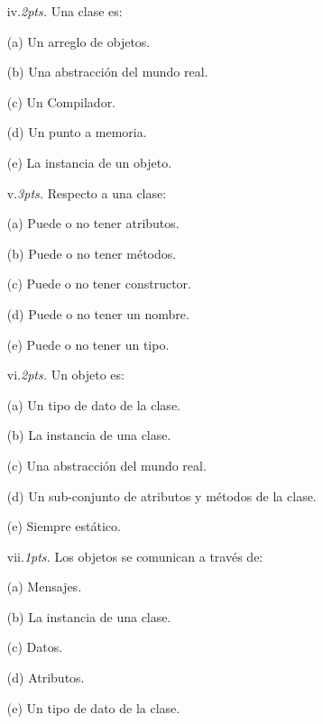\documentclass[10pt]{article}
\begin{document}
\begin{enumerate}
{\begin{multicols}{2}
    \begin{enumerate}[label=(\alph*)]
        \item[iv.\emph{2pts.}] Una clase es:
        \item[(a)] Un arreglo de objetos.
        \item[(b)] Una abstracci\'on del mundo real.
        \item[(c)] Un  Compilador.
        \item[(d)] Un punto a memoria.
        \item[(e)] La instancia de un objeto.
    \end{enumerate}

    \begin{enumerate}[label=(\alph*)]
        \item[v.\emph{3pts.}] Respecto a una clase:
        \item[(a)] Puede o no tener atributos.
        \item[(b)] Puede o no tener m\'etodos.
        \item[(c)] Puede o no tener constructor.
        \item[(d)] Puede o no tener un nombre.
        \item[(e)] Puede o no tener un tipo.
    \end{enumerate}

    \begin{enumerate}[label=(\alph*)]
        \item[vi.\emph{2pts.}] Un objeto es:
        \item[(a)] Un tipo de dato de la clase.
        \item[(b)] La instancia de una clase.
        \item[(c)] Una abstracci\'on del mundo real.
        \item[(d)] Un sub-conjunto de atributos y m\'etodos de la clase.
        \item[(e)] Siempre est\'atico.
    \end{enumerate}

    \begin{enumerate}[label=(\alph*)]
        \item[vii.\emph{1pts.}] Los objetos se comunican a trav\'es de:
        \item[(a)] Mensajes.
        \item[(b)] La instancia de una clase.
        \item[(c)] Datos.
        \item[(d)] Atributos.
        \item[(e)] Un tipo de dato de la clase.
    \end{enumerate}


\end{multicols}}
\end{enumerate}
\end{document}
